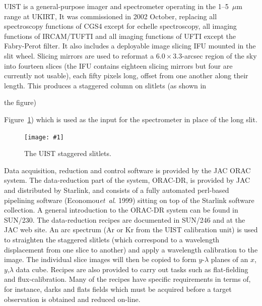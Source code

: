 \documentclass[twoside,11pt]{article}
\newcommand{\htmladdnormallink}[2]{#1}
\newcommand{\htmladdimg}[1]{}
\newcommand{\xref}[3]{#1}
\newcommand{\latex}[1]{#1}
\newcommand{\myfig} [5] {
  \begin{figure}[thb]
    \centering\texttt{[image: \#1]}
    \typeout{#1 inserted on page \arabic{page}}
    \caption{\label{#4}#5}
  \end{figure}
  }
\newcommand{\myfig}[5]{
    \label{#4} \htmladdimg{#3}\\
    Figure: #5\\
    }
\begin{document}
UIST is a general-purpose imager and spectrometer operating in the
1--5~$\mu$m range at
\htmladdnormallink{UKIRT}{http://www.jach.hawaii.edu/UKIRT/}, It was
commissioned in 2002 October, replacing all spectroscopy functions of
CGS4 except for echelle spectroscopy, all imaging functions of
IRCAM/TUFTI and all imaging functions of UFTI except the Fabry-Perot
filter.  It also includes a deployable image slicing IFU mounted in
the slit wheel.  Slicing mirrors are used to reformat a
$6.0\times3.3$-arcsec region of the sky into fourteen slices (the IFU
contains eighteen slicing mirrors but four are currently not usable),
each fifty pixels long, offset from one another along their length.  This
produces a staggered column on slitlets (as shown in
\begin{htmlonly}
the figure)
\end{htmlonly}
\latex{Figure~\ref{sc16_uist_fig})} which is used as the input for the
spectrometer in place of the long slit.

\myfig{sc16_uist.eps}{height=0.6\textheight}{sc16_uist.gif}{sc16_uist_fig}{The UIST staggered slitlets.} 

Data acquisition, reduction and control software is provided by the
\htmladdnormallink{JAC}{http://www.jach.hawaii.edu/} ORAC system.  The
data-reduction part of the system,
\htmladdnormallink{ORAC-DR}{http://www.oracdr.org},
is provided by JAC and distributed by Starlink, and consists of a 
fully automated perl-based \htmladdnormallink{pipelining
software}{http://monet.astro.uiuc.edu/adass98/Proceedings/economouf/}\latex{
(Economou\emph{et~al}. 1999)} sitting on top of the Starlink software
collection.  A general introduction to the ORAC-DR system can be found
in \xref{SUN/230}{sun230}{}.  The data-reduction recipes are 
documented in \xref{SUN/246}{sun246}{} and at the 
\htmladdnormallink{JAC web
site}{http://www.jach.hawaii.edu/UKIRT/instruments/uist/ifu/uistoracdr.html}.
An arc spectrum (Ar or Kr from the UIST calibration unit) is used to
straighten the staggered slitlets (which correspond to a wavelength
displacement from one slice to another) and apply a wavelength
calibration to the image.  The individual slice images will then be
copied to form $y$-$\lambda$ planes of an $x$,$y$,$\lambda$ data cube.
Recipes are also provided to carry out tasks such as flat-fielding and
flux-calibration.  Many of the recipes have specific requirements in
terms of, for instance, darks and flats fields which must be acquired
before a target observation is obtained and reduced on-line.
\end{document}

